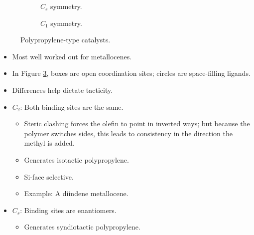 \documentclass[../notes.tex]{subfiles}
\begin{document}
\begin{itemize}
\begin{figure}[h!]
\begin{subfigure}[b]{0.3\linewidth}
            \caption{$C_s$ symmetry.}
            \label{fig:catalysts-polypropyleneb}
        \end{subfigure}
        \begin{subfigure}[b]{0.3\linewidth}
            \centering
            \caption{$C_1$ symmetry.}
            \label{fig:catalysts-polypropylenec}
        \end{subfigure}
        \caption{Polypropylene-type catalysts.}
        \label{fig:catalysts-polypropylene}
    \end{figure}
    \begin{itemize}
        \item Most well worked out for metallocenes.
        \item In Figure \ref{fig:catalysts-polypropylene}, boxes are open coordination sites; circles are space-filling ligands.
        \item Differences help dictate tacticity.
        \item $C_2$: Both binding sites are the same.
        \begin{itemize}
            \item Steric clashing forces the olefin to point in inverted ways; but because the polymer switches sides, this leads to consistency in the direction the methyl is added.
            \item Generates isotactic polypropylene.
            \item Si-face selective.
            \item Example: A diindene metallocene.
        \end{itemize}
        \item $C_s$: Binding sites are enantiomers.
        \begin{itemize}
            \item Generates syndiotactic polypropylene.

\end{itemize}
\end{itemize}
\end{itemize}
\end{document}
